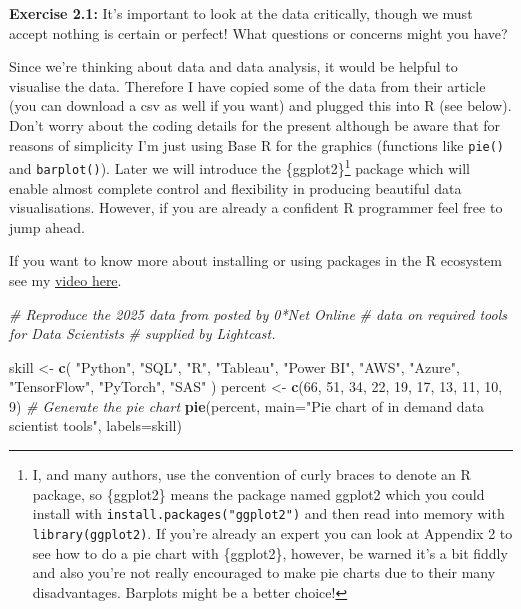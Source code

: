 \documentclass[
]{article}
\newenvironment{Shaded}{\begin{snugshade}}{\end{snugshade}}
\newcommand{\AttributeTok}[1]{\textcolor[rgb]{0.13,0.29,0.53}{#1}}
\newcommand{\CommentTok}[1]{\textcolor[rgb]{0.56,0.35,0.01}{\textit{#1}}}
\newcommand{\DecValTok}[1]{\textcolor[rgb]{0.00,0.00,0.81}{#1}}
\newcommand{\FunctionTok}[1]{\textcolor[rgb]{0.13,0.29,0.53}{\textbf{#1}}}
\newcommand{\NormalTok}[1]{#1}
\newcommand{\OtherTok}[1]{\textcolor[rgb]{0.56,0.35,0.01}{#1}}
\newcommand{\StringTok}[1]{\textcolor[rgb]{0.31,0.60,0.02}{#1}}
\begin{document}
\textbf{Exercise 2.1:} It's important to look at the data critically,
though we must accept nothing is certain or perfect! What questions or
concerns might you have?

Since we're thinking about data and data analysis, it would be helpful
to visualise the data. Therefore I have copied some of the data from
their article (you can download a csv as well if you want) and plugged
this into R (see below). Don't worry about the coding details for the
present although be aware that for reasons of simplicity I'm just using
Base R for the graphics (functions like \texttt{pie()} and
\texttt{barplot()}). Later we will introduce the \{ggplot2\}\footnote{I,
  and many authors, use the convention of curly braces to denote an R
  package, so \{ggplot2\} means the package named ggplot2 which you
  could install with \texttt{install.packages("ggplot2")} and then read
  into memory with \texttt{library(ggplot2)}. If you're already an
  expert you can look at Appendix 2 to see how to do a pie chart with
  \{ggplot2\}, however, be warned it's a bit fiddly and also you're not
  really encouraged to make pie charts due to their many disadvantages.
  Barplots might be a better choice!} package which will enable almost
complete control and flexibility in producing beautiful data
visualisations. However, if you are already a confident R programmer
feel free to jump ahead.

If you want to know more about installing or using packages in the R
ecosystem see my
\href{https://www.loom.com/share/87b088c301cd40ac9aa4ff714141a6f3}{video
here}.

\begin{Shaded}
\begin{Highlighting}[]
\CommentTok{\# Reproduce the 2025 data from posted by 0*Net Online  }
\CommentTok{\# data on required tools for Data Scientists}
\CommentTok{\# supplied by Lightcast.}

\NormalTok{skill }\OtherTok{\textless{}{-}} \FunctionTok{c}\NormalTok{(}
  \StringTok{"Python"}\NormalTok{, }\StringTok{"SQL"}\NormalTok{, }\StringTok{"R"}\NormalTok{, }\StringTok{"Tableau"}\NormalTok{, }\StringTok{"Power BI"}\NormalTok{,}
  \StringTok{"AWS"}\NormalTok{, }\StringTok{"Azure"}\NormalTok{, }\StringTok{"TensorFlow"}\NormalTok{, }\StringTok{"PyTorch"}\NormalTok{, }\StringTok{"SAS"}
\NormalTok{)}
\NormalTok{percent }\OtherTok{\textless{}{-}} \FunctionTok{c}\NormalTok{(}\DecValTok{66}\NormalTok{, }\DecValTok{51}\NormalTok{, }\DecValTok{34}\NormalTok{, }\DecValTok{22}\NormalTok{, }\DecValTok{19}\NormalTok{, }\DecValTok{17}\NormalTok{, }\DecValTok{13}\NormalTok{, }\DecValTok{11}\NormalTok{, }\DecValTok{10}\NormalTok{, }\DecValTok{9}\NormalTok{)}
\CommentTok{\# Generate the pie chart}
\FunctionTok{pie}\NormalTok{(percent, }\AttributeTok{main=}\StringTok{"Pie chart of in demand data scientist tools"}\NormalTok{, }\AttributeTok{labels=}\NormalTok{skill)}
\end{Highlighting}
\end{Shaded}
\end{document}
